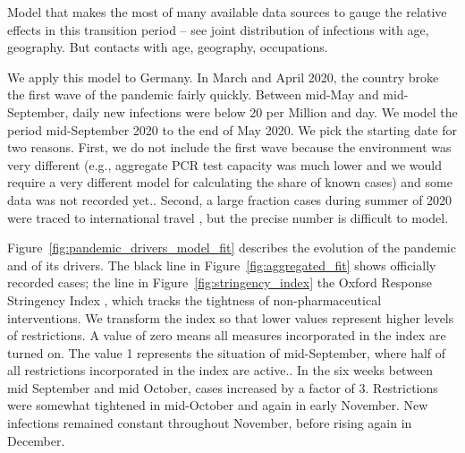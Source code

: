 Model that makes the most of many available data sources to gauge the relative effects in
this transition period -- see joint distribution of infections with age, geography. But
contacts with age, geography, occupations.

We apply this model to Germany. In March and April 2020, the country broke the first wave
of the pandemic fairly quickly. Between mid-May and mid-September, daily new infections
were below 20 per Million and day. We model the
period mid-September 2020 to the end of May 2020. We pick the starting date for two
reasons. First, we do not include the first wave because the environment was very
different (e.g., aggregate PCR test capacity was much lower and we would require a very
different model for calculating the share of known cases) and some data was not recorded
yet.. Second, a
large fraction cases during summer of 2020 were traced to international
travel \citep{KochInstitut2021}, but the precise number is difficult to model.

Figure~\ref{fig:pandemic_drivers_model_fit} describes the evolution of the pandemic and
of its drivers. The black line in Figure~\ref{fig:aggregated_fit} shows officially
recorded cases; the  line in
Figure~\ref{fig:stringency_index} the Oxford Response Stringency Index \citep{Hale2020},
which tracks the tightness of non-pharmaceutical interventions. We transform the index so
that lower values represent higher levels of restrictions. A value of zero means all
measures incorporated in the index are turned on. The value 1 represents the situation of
mid-September, where half of all restrictions incorporated in the index are
active.. In the six weeks between mid September and mid October, cases
increased by a factor of 3.
Restrictions were somewhat tightened in mid-October and again in early November. New
infections remained constant throughout November, before rising again in December.

